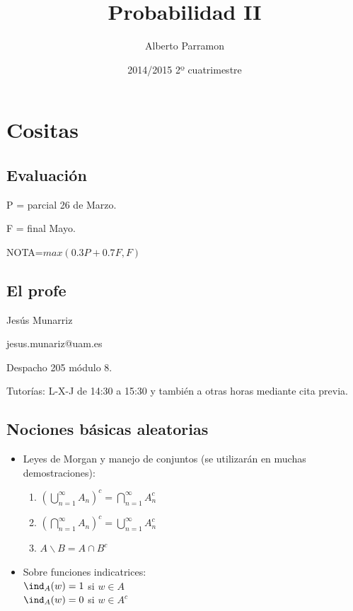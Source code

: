 \documentclass{apuntes}
\author{Alberto Parramon}
\date{2014/2015 2º cuatrimestre}
\title{Probabilidad II}
\begin{document}
\pagestyle{plain}
\maketitle

\tableofcontents
\newpage
\chapter{Cositas}


\section{Evaluación}
P = parcial 26 de Marzo.

F = final Mayo.

NOTA=$max(0.3P+0.7F,F)$ 

\section{El profe}
Jesús Munarriz

jesus.munariz@uam.es

Despacho 205 módulo 8.

Tutorías: L-X-J de 14:30 a 15:30 y también a otras horas mediante cita previa.

\section{Nociones básicas aleatorias}
\begin{itemize}
\item Leyes de Morgan y manejo de conjuntos (se utilizarán en muchas demostraciones):
\begin{enumerate}
\item $(\bigcup_{n=1}^{\infty}A_n)^c = \bigcap_{n=1}^{\infty}A_n^c$
\item $(\bigcap_{n=1}^{\infty}A_n)^c = \bigcup_{n=1}^{\infty}A_n^c$
\item $A \backslash B = A \cap B^c$

\end{enumerate}
\item Sobre funciones indicatrices:\\
$\ind_A(w)=1$ si $w \in A$\\
$\ind_A(w)=0$ si $w \in A^c$
\end{itemize}
\end{document}
